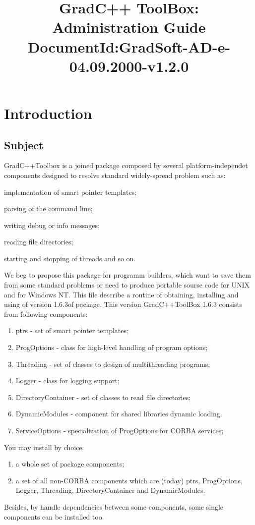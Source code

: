 \documentclass[10pt]{article}
\title{ GradC++ ToolBox: Administration Guide  
       \newline
       \small{DocumentId:GradSoft-AD-e-04.09.2000-v1.2.0}
      }
\newcommand{\version}{1.6.3}
\begin{document}
\maketitle{}

\tableofcontents

\section{Introduction}

\subsection{Subject}

GradC++Toolbox is a joined package composed by several platform-independet components
designed to resolve standard widely-spread problem such as:
\begin{list}{-}{}
  \item implementation of smart pointer templates;
  \item parsing of the command line;
  \item writing debug or info messages;
  \item reading file directories;
  \item starting and stopping of threads and so on.
\end{list}
We beg to propose this package for programm builders,
which want to save them from some standard problems
or need to produce portable sourse code for UNIX and for Windows NT.
This file describe a routine of obtaining, installing and using of version \version of package.
This version GradC++ToolBox 1.6.3 consists from following components:
\begin{enumerate}
  \item ptrs - set of smart pointer templates;
  \item ProgOptions - class for high-level handling of program options;
  \item Threading - set of classes to design of multithreading programs;
  \item Logger - class for logging support;
  \item DirectoryContainer - set of classes to read file directories;
  \item DynamicModules - component for shared libraries dynamic loading.
  \item ServiceOptions - specialization of ProgOptions for CORBA services;
\end{enumerate}
You may install by choice:
\begin{enumerate}
  \item a whole set of package components;
  \item a set of all non-CORBA components which are (today) ptrs, ProgOptions, Logger, Threading, DirectoryContainer and DynamicModules.
\end{enumerate}
Besides, by handle dependencies between some components, some single components can be installed too.
\end{document}
